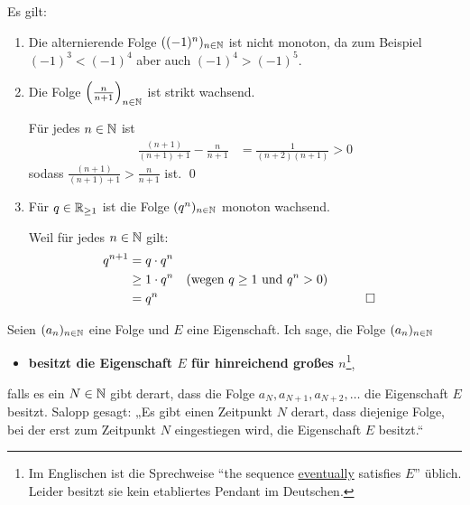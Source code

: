\begin{bsp}
Es gilt:
    \begin{enumerate}
        \item Die alternierende Folge $((-1)^n)_{n\in \mathbb N}$ ist nicht monoton, da zum Beispiel $(-1)^3< (-1)^4$ aber auch $(-1)^4>(-1)^5$.
        \item Die Folge $\left(\frac{n}{n+1}\right)_{n\in \mathbb N}$ ist strikt wachsend.
        \begin{bew}
            Für jedes $n\in \mathbb N$ ist
            \begin{align*}
                \frac{(n+1)}{(n+1)+1} - \frac{n}{n+1} & = \frac{1}{(n+2)(n+1)} >0
            \end{align*}
            sodass $\frac{(n+1)}{(n+1)+1} > \frac{n}{n+1}$ ist. \qed
        \end{bew}
        \item Für $q\in \mathbb R_{\ge 1}$ ist die Folge $(q^n)_{n\in \mathbb N}$ monoton wachsend.
        \begin{bew}
            Weil für jedes $n\in \mathbb N$ gilt:
            \begin{align*}
                q^{n+1} & = q \cdot q^n \\
                & \ge 1 \cdot q^n && (\text{wegen $q\ge 1$ und $q^n>0$})\\
                & = q^n &&&& \qed
            \end{align*}
        \end{bew}
    \end{enumerate}
\end{bsp}


\begin{de}[``eventually''] \label{def:eventually} 
    Seien $(a_n)_{n\in \mathbb N}$ eine Folge und $E$ eine Eigenschaft. Ich sage, die Folge $(a_n)_{n\in \mathbb N}$
    \begin{itemize}
        \item[] \textbf{besitzt die Eigenschaft $E$ für hinreichend großes $n$}\footnote{Im Englischen ist die Sprechweise ``the sequence \href{https://en.wikipedia.org/wiki/Eventually_(mathematics)}{eventually} satisfies $E$'' üblich. Leider besitzt sie kein etabliertes Pendant im Deutschen.},
    \end{itemize}
    falls es ein $N\in \mathbb N$ gibt derart, dass die Folge $a_N,a_{N+1},a_{N+2},\dots$ die Eigenschaft $E$ besitzt. Salopp gesagt: „Es gibt einen Zeitpunkt $N$ derart, dass diejenige Folge, bei der erst zum Zeitpunkt $N$ eingestiegen wird, die Eigenschaft $E$ besitzt.“
\end{de}


